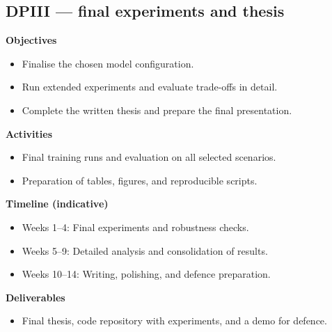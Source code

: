 \documentclass[12pt,a4paper]{report}
\begin{document}
\subsection*{DPIII — final experiments and thesis}
\textbf{Objectives}
\begin{itemize}
  \item Finalise the chosen model configuration.
  \item Run extended experiments and evaluate trade-offs in detail.
  \item Complete the written thesis and prepare the final presentation.
\end{itemize}
\textbf{Activities}
\begin{itemize}
  \item Final training runs and evaluation on all selected scenarios.
  \item Preparation of tables, figures, and reproducible scripts.
\end{itemize}
\textbf{Timeline (indicative)}
\begin{itemize}
  \item Weeks 1--4: Final experiments and robustness checks.
  \item Weeks 5--9: Detailed analysis and consolidation of results.
  \item Weeks 10--14: Writing, polishing, and defence preparation.
\end{itemize}
\textbf{Deliverables}
\begin{itemize}
  \item Final thesis, code repository with experiments, and a demo for defence.
\end{itemize}
\end{document}
